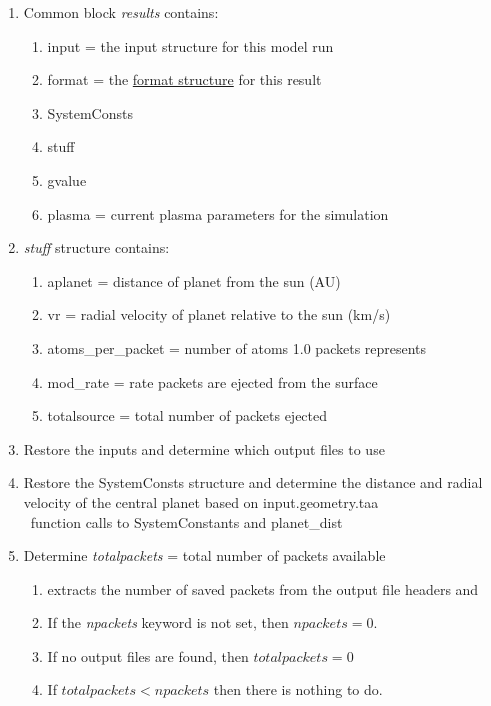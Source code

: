 \documentclass[11pt]{article}
\begin{document}
\begin{enumerate}
\item Common block \textit{results} contains: 
  \begin{enumerate} 
  \item input = the input structure for this model run
  \item format = the \hyperref[format]{format structure} for this result
  \item SystemConsts
  \item stuff
  \item gvalue
  \item plasma = current plasma parameters for the simulation
  \end{enumerate}
\item \textit{stuff} structure contains:
  \begin{enumerate}
  \item aplanet = distance of planet from the sun (AU)
  \item vr = radial velocity of planet relative to the sun (km/s)
  \item atoms\_per\_packet = number of atoms 1.0 packets represents
  \item mod\_rate = rate packets are ejected from the surface
  \item totalsource = total number of packets ejected
  \end{enumerate}

\item Restore the inputs and determine which output files to use 

\item Restore the SystemConsts structure and determine the distance and radial 
  velocity of the central planet based on input.geometry.taa \\
  \textbullet\ function calls to {\color{blue}SystemConstants} and 
  {\color{blue}planet\_dist}

\item Determine \textit{totalpackets} = total number of packets available
  \begin{enumerate} 
  \item extracts the number of saved packets from the output file headers and
  \item If the \textit{npackets} keyword is not set, then $npackets=0$.
  \item If no output files are found, then $totalpackets = 0$
  \item If $totalpackets < npackets$ then there is nothing to do. 
  \end{enumerate}


\end{enumerate}
\end{document}
